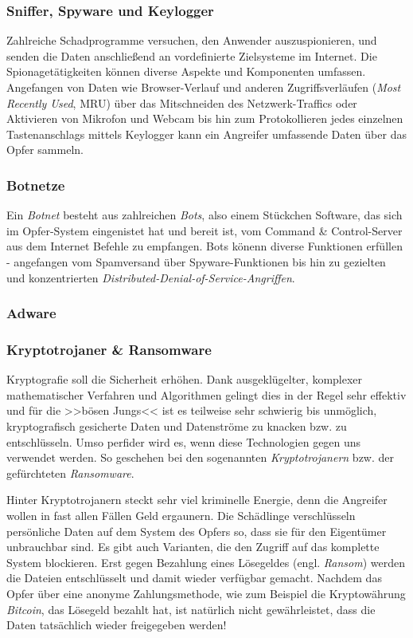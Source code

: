 \subsubsection{Sniffer, Spyware und Keylogger}
\label{sec:SnifferSpywareKeylogger}

Zahlreiche Schadprogramme versuchen, den Anwender auszuspionieren, und senden die Daten anschließend an vordefinierte Zielsysteme im Internet. Die Spionagetätigkeiten können diverse Aspekte und Komponenten umfassen. Angefangen von Daten wie Browser-Verlauf und anderen Zugriffsverläufen (\textit{Most Recently Used}, MRU) über das Mitschneiden des Netzwerk-Traffics oder Aktivieren von Mikrofon und Webcam bis hin zum Protokollieren jedes einzelnen Tastenanschlags mittels Keylogger kann ein Angreifer umfassende Daten über das Opfer sammeln.

\subsubsection{Botnetze}
\label{sec:Botnetze}

Ein \textit{Botnet} besteht aus zahlreichen \textit{Bots}, also einem Stückchen Software, das sich im Opfer-System eingenistet hat und bereit ist, vom Command \& Control-Server aus dem Internet Befehle zu empfangen. Bots könenn diverse Funktionen erfüllen - angefangen vom Spamversand über Spyware-Funktionen bis hin zu gezielten und konzentrierten \textit{Distributed-Denial-of-Service-Angriffen}.

\subsubsection{Adware}
\label{sec:Adware}

\subsubsection{Kryptotrojaner \& Ransomware}
\label{sec:Ransomware}

Kryptografie soll die Sicherheit erhöhen. Dank ausgeklügelter, komplexer mathematischer Verfahren und Algorithmen gelingt dies in der Regel sehr effektiv und für die >>bösen Jungs<< ist es teilweise sehr schwierig bis unmöglich, kryptografisch gesicherte Daten und Datenströme zu knacken bzw. zu entschlüsseln. Umso perfider wird es, wenn diese Technologien gegen uns verwendet werden. So geschehen bei den sogenannten \textit{Kryptotrojanern} bzw. der gefürchteten \textit{Ransomware}.

Hinter Kryptotrojanern steckt sehr viel kriminelle Energie, denn die Angreifer wollen in fast allen Fällen Geld ergaunern. Die Schädlinge verschlüsseln persönliche Daten auf dem System des Opfers so, dass sie für den Eigentümer unbrauchbar sind. Es gibt auch Varianten, die den Zugriff auf das komplette System blockieren. Erst gegen Bezahlung eines Lösegeldes (engl. \textit{Ransom}) werden die Dateien entschlüsselt und damit wieder verfügbar gemacht. Nachdem das Opfer über eine anonyme Zahlungsmethode, wie zum Beispiel die Kryptowährung \textit{Bitcoin}, das Lösegeld bezahlt hat, ist natürlich nicht gewährleistet, dass die Daten tatsächlich wieder freigegeben werden!

